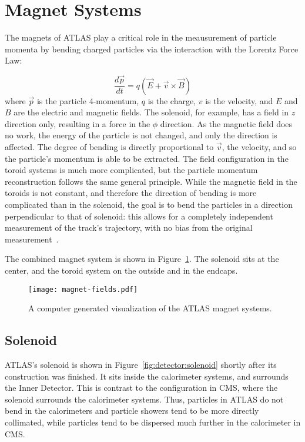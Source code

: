 \section{Magnet Systems}

The magnets of ATLAS play a critical role in the meausurement of particle momenta by bending charged particles via the interaction with the Lorentz Force Law:

\begin{equation}
\frac{d \vec{p}}{d t} = q (\vec{E} + \vec{v} \times \vec{B})
\end{equation}
%
where $\vec{p}$ is the particle 4-momentum, $q$ is the charge, $v$ is the velocity, and $E$ and $B$ are the electric and magnetic fields. The solenoid, for example, has a field in $z$ direction only, resulting in a force in the $\phi$ direction. As the magnetic field does no work, the energy of the particle is not changed, and only the direction is affected. The degree of bending is directly proportional to $\vec{v}$, the velocity, and so the particle's momentum is able to be extracted. The field configuration in the toroid systems is much more complicated, but the particle momentum reconstruction follows the same general principle. While the magnetic field in the toroids is not constant, and therefore the direction of bending is more complicated than in the solenoid, the goal is to bend the particles in a direction perpendicular to that of solenoid: this allows for a completely independent measurement of the track's trajectory, with no bias from the original measurement~\cite{ATLASMS}.

The combined magnet system is shown in Figure~\ref{fig:detector:magnets}. The solenoid sits at the center, and the toroid system on the outside and in the endcaps.


\begin{figure}
\centering
\texttt{[image: magnet-fields.pdf]}
\caption{A computer generated visualization of the ATLAS magnet systems.}
\label{fig:detector:magnets}
\end{figure}



\subsection{Solenoid}
\label{atlas:magnets:solenoid}

ATLAS's solenoid is shown in Figure~\ref{fig:detector:solenoid} shortly after its construction was finished. It sits inside the calorimeter systems, and surrounds the Inner Detector. This is contrast to the configuration in CMS, where the solenoid surrounds the calorimeter systems. Thus, particles in ATLAS do not bend in the calorimeters and particle showers tend to be more directly collimated, while particles tend to be dispersed much further in the calorimeter in CMS.

